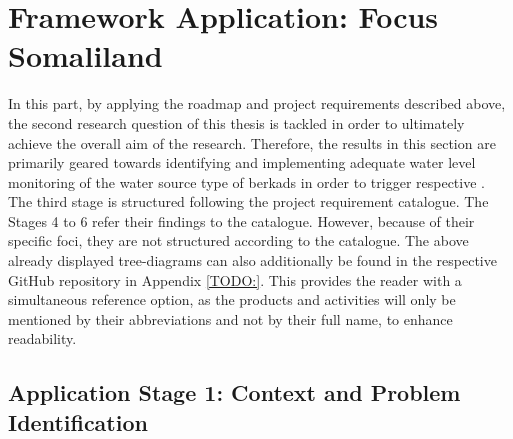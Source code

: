 
\pagebreak


\section{Framework Application: Focus Somaliland}\label{sec:f_a}

In this part, by applying the roadmap and project requirements described above, the second research question of this thesis is tackled in order to ultimately achieve the overall aim of the research. Therefore, the results in this section are primarily geared towards identifying and implementing adequate water level monitoring of the water source type of berkads in order to trigger respective . The third stage is structured following the project requirement catalogue. The Stages 4 to 6 refer their findings to the catalogue. However, because of their specific foci, they are not structured according to the catalogue. The above already displayed tree-diagrams can also additionally be found in the respective GitHub repository in Appendix \ref*{TODO:}. This provides the reader with a simultaneous reference option, as the products and activities will only be mentioned by their abbreviations and not by their full name, to enhance readability.

\subsection{Application Stage 1: Context and Problem Identification}\label{subsec:stage1_appl}

